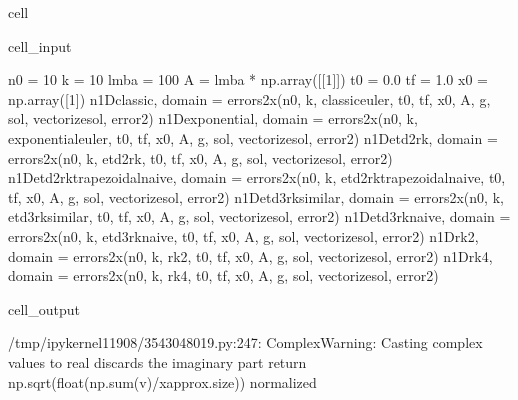 \documentclass[letterpaper,10pt,english]{jupyterBook}
\begin{document}
\begin{sphinxuseclass}{cell}\begin{sphinxVerbatimInput}

\begin{sphinxuseclass}{cell_input}
\begin{sphinxVerbatim}[commandchars=\\\{\}]
n0 = 10
k = 10
lmba = 100
A = lmba * np.array([[1]])
t0 = 0.0
tf = 1.0
x0 = np.array([1])
n\PYGZus{}1D\PYGZus{}classic, domain = errors\PYGZus{}2x(n0, k, classic\PYGZus{}euler, t0, tf, x0, A, g, sol, vectorize\PYGZus{}sol, error\PYGZus{}2)
n\PYGZus{}1D\PYGZus{}exponential, domain = errors\PYGZus{}2x(n0, k, exponential\PYGZus{}euler, t0, tf, x0, A, g, sol, vectorize\PYGZus{}sol, error\PYGZus{}2)
n\PYGZus{}1D\PYGZus{}etd2rk, domain = errors\PYGZus{}2x(n0, k, etd2rk, t0, tf, x0, A, g, sol, vectorize\PYGZus{}sol, error\PYGZus{}2)
n\PYGZus{}1D\PYGZus{}etd2rk\PYGZus{}trapezoidal\PYGZus{}naive, domain = errors\PYGZus{}2x(n0, k, etd2rk\PYGZus{}trapezoidal\PYGZus{}naive, t0, tf, x0, A, g, sol, vectorize\PYGZus{}sol, error\PYGZus{}2)
n\PYGZus{}1D\PYGZus{}etd3rk\PYGZus{}similar, domain = errors\PYGZus{}2x(n0, k, etd3rk\PYGZus{}similar, t0, tf, x0, A, g, sol, vectorize\PYGZus{}sol, error\PYGZus{}2)
n\PYGZus{}1D\PYGZus{}etd3rk\PYGZus{}naive, domain = errors\PYGZus{}2x(n0, k, etd3rk\PYGZus{}naive, t0, tf, x0, A, g, sol, vectorize\PYGZus{}sol, error\PYGZus{}2)
n\PYGZus{}1D\PYGZus{}rk2, domain = errors\PYGZus{}2x(n0, k, rk2, t0, tf, x0, A, g, sol, vectorize\PYGZus{}sol, error\PYGZus{}2)
n\PYGZus{}1D\PYGZus{}rk4, domain = errors\PYGZus{}2x(n0, k, rk4, t0, tf, x0, A, g, sol, vectorize\PYGZus{}sol, error\PYGZus{}2)
\end{sphinxVerbatim}

\end{sphinxuseclass}\end{sphinxVerbatimInput}
\begin{sphinxVerbatimOutput}

\begin{sphinxuseclass}{cell_output}
\begin{sphinxVerbatim}[commandchars=\\\{\}]
/tmp/ipykernel\PYGZus{}11908/3543048019.py:247: ComplexWarning: Casting complex values to real discards the imaginary part
  return np.sqrt(float(np.sum(v)/x\PYGZus{}approx.size)) \PYGZsh{}normalized
\end{sphinxVerbatim}

\end{sphinxuseclass}\end{sphinxVerbatimOutput}

\end{sphinxuseclass}
\end{document}
